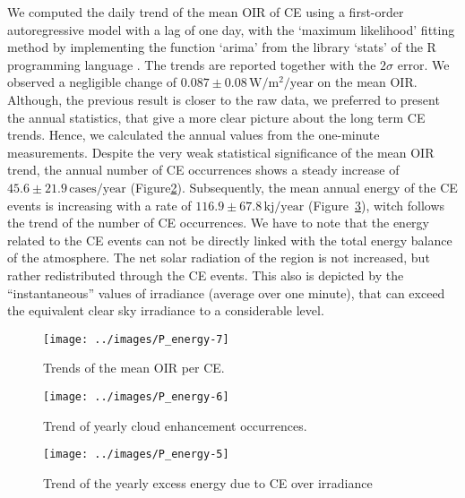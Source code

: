 \documentclass[preprint, 5p,
authoryear]{elsarticle} %
\begin{document}
We computed the daily trend of the mean OIR of CE using a first-order
autoregressive model with a lag of one day, with the `maximum
likelihood' fitting method \citep{Gardner1980, Jones1980} by
implementing the function `arima' from the library `stats' of the R
programming language \citep{RCT2023}. The trends are reported together
with the \(2\sigma\) error. We observed a negligible change of
\(0.087\pm 0.08\,\text{W}/\text{m}^2/\text{year}\) on the mean OIR.
Although, the previous result is closer to the raw data, we preferred to
present the annual statistics, that give a more clear picture about the
long term CE trends. Hence, we calculated the annual values from the
one-minute measurements. Despite the very weak statistical significance
of the mean OIR trend, the annual number of CE occurrences shows a
steady increase of \(45.6\pm 21.9\,\text{cases}/\text{year}\)
(Figure\nobreakspace{}\ref{fig:P-energy-N}). Subsequently, the mean
annual energy of the CE events is increasing with a rate of
\(116.9\pm 67.8\,\text{kj}/\text{year}\)
(Figure~\ref{fig:P-energy-sum}), witch follows the trend of the number
of CE occurrences. We have to note that the energy related to the CE
events can not be directly linked with the total energy balance of the
atmosphere. The net solar radiation of the region is not increased, but
rather redistributed through the CE events. This also is depicted by the
``instantaneous'' values of irradiance (average over one minute), that
can exceed the equivalent clear sky irradiance to a considerable level.

\begin{figure}

{\centering \texttt{[image: ../images/P\_energy-7]} 

}

\caption{Trends of the mean OIR per CE.}\label{fig:P-energy-mean}
\end{figure}

\begin{figure}

{\centering \texttt{[image: ../images/P\_energy-6]} 

}

\caption{Trend of yearly cloud enhancement occurrences.}\label{fig:P-energy-N}
\end{figure}

\begin{figure}

{\centering \texttt{[image: ../images/P\_energy-5]} 

}

\caption{Trend of the yearly excess energy due to CE over irradiance}\label{fig:P-energy-sum}
\end{figure}
\end{document}
